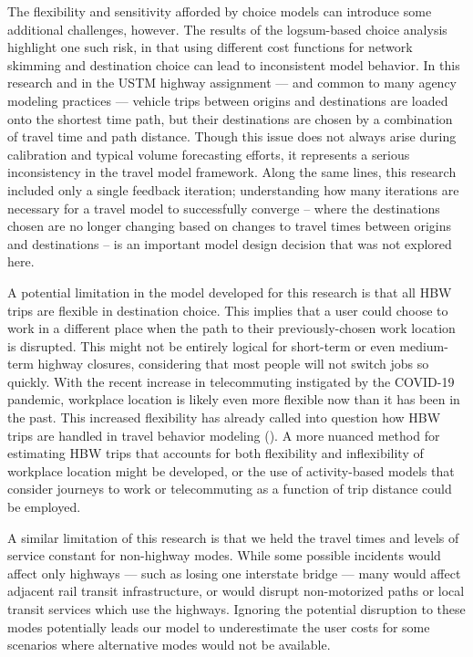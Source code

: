 \documentclass[]{ascelike-new}
\begin{document}
The flexibility and sensitivity afforded by choice models can introduce
some additional challenges, however. The results of the logsum-based
choice analysis highlight one such risk, in that using different cost
functions for network skimming and destination choice can lead to
inconsistent model behavior. In this research and in the USTM highway
assignment --- and common to many agency modeling practices --- vehicle
trips between origins and destinations are loaded onto the shortest time
path, but their destinations are chosen by a combination of travel time
and path distance. Though this issue does not always arise during
calibration and typical volume forecasting efforts, it represents a
serious inconsistency in the travel model framework. Along the same
lines, this research included only a single feedback iteration;
understanding how many iterations are necessary for a travel model to
successfully converge -- where the destinations chosen are no longer
changing based on changes to travel times between origins and
destinations -- is an important model design decision that was not
explored here.

A potential limitation in the model developed for this research is that
all HBW trips are flexible in destination choice. This implies that a
user could choose to work in a different place when the path to their
previously-chosen work location is disrupted. This might not be entirely
logical for short-term or even medium-term highway closures, considering
that most people will not switch jobs so quickly. With the recent
increase in telecommuting instigated by the COVID-19 pandemic, workplace
location is likely even more flexible now than it has been in the past.
This increased flexibility has already called into question how HBW
trips are handled in travel behavior modeling
(). A more nuanced method for
estimating HBW trips that accounts for both flexibility and
inflexibility of workplace location might be developed, or the use of
activity-based models that consider journeys to work or telecommuting as
a function of trip distance could be employed.

A similar limitation of this research is that we held the travel times
and levels of service constant for non-highway modes. While some
possible incidents would affect only highways --- such as losing one
interstate bridge --- many would affect adjacent rail transit
infrastructure, or would disrupt non-motorized paths or local transit
services which use the highways. Ignoring the potential disruption to
these modes potentially leads our model to underestimate the user costs
for some scenarios where alternative modes would not be available.
\end{document}
